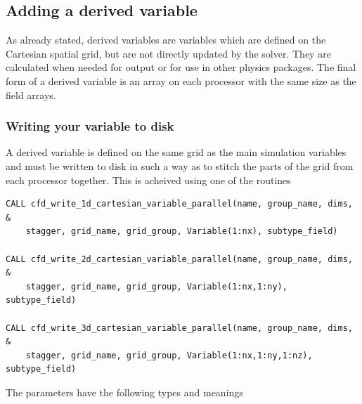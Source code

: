 \documentclass[12pt,a4paper]{article}
\newcommand{\simpleboxverbatim}{\begin{Verbatim}[obeytabs=true,frame=single,
  framerule=0.5mm,rulecolor=\color{warwickmid},formatcom=\color{black}]}
\begin{document}
\subsection{Adding a derived variable}

As already stated, derived variables are variables which are defined on the
Cartesian spatial grid, but are not directly updated by the solver. They are
calculated when needed for output or for use in other physics packages. The
final form of a derived variable is an array on each processor with the same
size as the field arrays.

\subsubsection{Writing your variable to disk}
A derived variable is defined on the same grid as the main simulation variables
and must be written to disk in such a way as to stitch the parts of the grid
from each processor together. This is acheived using one of the routines
\simpleboxverbatim
CALL cfd_write_1d_cartesian_variable_parallel(name, group_name, dims, &
    stagger, grid_name, grid_group, Variable(1:nx), subtype_field)

CALL cfd_write_2d_cartesian_variable_parallel(name, group_name, dims, &
    stagger, grid_name, grid_group, Variable(1:nx,1:ny), subtype_field)

CALL cfd_write_3d_cartesian_variable_parallel(name, group_name, dims, &
    stagger, grid_name, grid_group, Variable(1:nx,1:ny,1:nz), subtype_field)
\end{Verbatim}
The parameters have the following types and meanings
\end{document}
